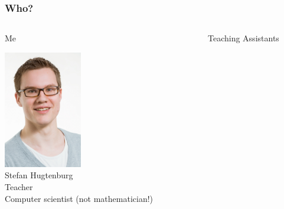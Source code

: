 \begin{frame}
	\frametitle{Who?}
	\begin{columns}[t]
			\begin{alertblock}{Me}
				\begin{center}
					\includegraphics[width=0.4\textwidth]{figures/stefan.png}\\
					Stefan Hugtenburg\\
					Teacher\\
					Computer scientist (not mathematician!)
				\end{center}	
			\end{alertblock}	
		\pause
			\begin{exampleblock}{Teaching Assistants}
		\begin{figure}[htpb]
			\begin{subfigure}[]{0.4\textwidth}
			\centering
			\includegraphics[width=\textwidth]{figures/yoshi.png}\\

\end{subfigure}
\end{figure}
\end{exampleblock}
\end{columns}
\end{frame}
